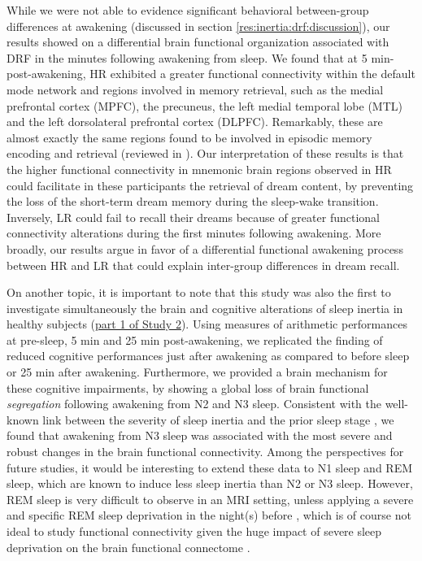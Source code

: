 While we were not able to evidence significant behavioral between-group differences at awakening (discussed in section \ref{res:inertia:drf:discussion}), our results showed on a differential brain functional organization associated with DRF in the minutes following awakening from sleep. We found that at 5 min-post-awakening, HR exhibited a greater functional connectivity within the default mode network and regions involved in memory retrieval, such as the medial prefrontal cortex (MPFC), the precuneus, the left medial temporal lobe (MTL) and the left dorsolateral prefrontal cortex (DLPFC). Remarkably, these are almost exactly the same regions found to be involved in episodic memory encoding and retrieval (reviewed in \citealp{spaniol_event-related_2009}). Our interpretation of these results is that the higher functional connectivity in mnemonic brain regions observed in HR could facilitate in these participants the retrieval of dream content, by preventing the loss of the short-term dream memory during the sleep-wake transition. Inversely, LR could fail to recall their dreams because of greater functional connectivity alterations during the first minutes following awakening. More broadly, our results argue in favor of a differential functional awakening process between HR and LR that could explain inter-group differences in dream recall.

On another topic, it is important to note that this study was also the first to investigate simultaneously the brain and cognitive alterations of sleep inertia in healthy subjects (\hyperref[res:inertia:inertia]{part 1 of Study 2}). Using measures of arithmetic performances at pre-sleep, 5 min and 25 min post-awakening, we replicated the finding of reduced cognitive performances just after awakening as compared to before sleep or 25 min after awakening. Furthermore, we provided a brain mechanism for these cognitive impairments, by showing a global loss of brain functional \emph{segregation} following awakening from N2 and N3 sleep. Consistent with the well-known link between the severity of sleep inertia and the prior sleep stage \citep{tassi_sleep_2000}, we found that awakening from N3 sleep was associated with the most severe and robust changes in the brain functional connectivity. Among the perspectives for future studies, it would be interesting to extend these data to N1 sleep and REM sleep, which are known to induce less sleep inertia than N2 or N3 sleep. However, REM sleep is very difficult to observe in an MRI setting, unless applying a severe and specific REM sleep deprivation in the night(s) before \citep{duyn_eeg-fmri_2012}, which is of course not ideal to study functional connectivity given the huge impact of severe sleep deprivation on the brain functional connectome \citep{de_havas_sleep_2012, yeo_functional_2015, krause_sleep-deprived_2017}.

